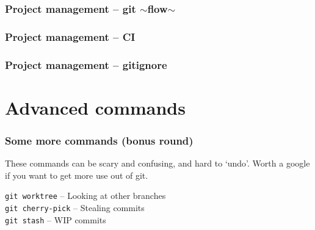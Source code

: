 \documentclass{beamer}
\begin{document}
\begin{frame}[fragile]
  \frametitle{Project management -- git $\sim$flow$\sim$}
\end{frame}

\begin{frame}[fragile]
  \frametitle{Project management -- CI} %
\end{frame}

\begin{frame}[fragile]
  \frametitle{Project management -- gitignore}
\end{frame}

\section{Advanced commands}

\begin{frame}[fragile]
  \frametitle{Some more commands (bonus round)}
  These commands can be scary and confusing, and hard to `undo'. Worth a google if you
  want to get more use out of git.
  \vspace{1em}
  
  \texttt{git worktree} -- Looking at other branches \\
  \texttt{git cherry-pick} -- Stealing commits \\
  \texttt{git stash} -- WIP commits \\
    
\end{frame}
\end{document}
